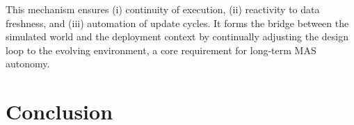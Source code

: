 This mechanism ensures (i) continuity of execution, (ii) reactivity to data freshness, and (iii) automation of update cycles. It forms the bridge between the simulated world and the deployment context by continually adjusting the design loop to the evolving environment, a core requirement for long-term MAS autonomy.


\chapter*{Conclusion}
